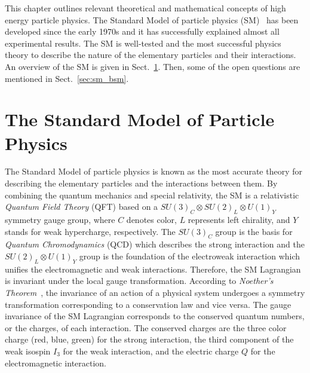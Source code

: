 This chapter outlines relevant theoretical and mathematical concepts of high energy particle physics.
The Standard Model of particle physics (SM)~\cite{Salam:1968rm, Glashow:1961tr, Weinberg:1967tq, Herrero:1998eq, Cottingham:2007zz} has been developed since the early 1970s and it has successfully explained almost all experimental results.
The SM is well-tested and the most successful physics theory to describe the nature of the elementary particles and their interactions.
An overview of the SM is given in Sect.~\ref{sec:sm}.
Then, some of the open questions are mentioned in Sect.~\ref{sec:sm_bsm}.


\section{The Standard Model of Particle Physics}
\label{sec:sm}
The Standard Model of particle physics is known as the most accurate theory for describing the elementary particles and the interactions between them.
By combining the quantum mechanics and special relativity, the SM is a relativistic \textit{Quantum Field Theory} (QFT) based on a $SU(3)_{C} \otimes SU(2)_{L} \otimes U(1)_{Y}$ symmetry gauge group, where $C$ denotes color, $L$ represents left chirality, and $Y$ stands for weak hypercharge, respectively.
The $SU(3)_{C}$ group is the basis for \textit{Quantum Chromodynamics} (QCD) which describes the strong interaction and the $SU(2)_{L} \otimes U(1)_{Y}$ group is the foundation of the electroweak interaction which unifies the electromagnetic and weak interactions.
Therefore, the SM Lagrangian is invariant under the local gauge transformation.
According to \textit{Noether's Theorem}~\cite{Noether:1918zz}, the invariance of an action of a physical system undergoes a symmetry transformation corresponding to a conservation law and vice versa. 
The gauge invariance of the SM Lagrangian corresponds to the conserved quantum numbers, or the charges, of each interaction.
The conserved charges are the three color charge (red, blue, green) for the strong interaction, the third component of the weak isospin $I_{3}$ for the weak interaction, and the electric charge $Q$ for the electromagnetic interaction.


